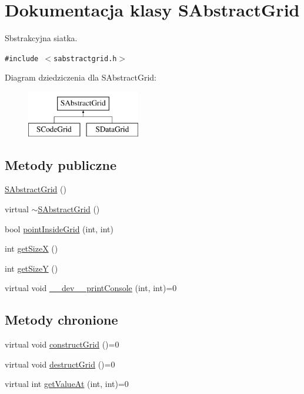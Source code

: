 \hypertarget{classSAbstractGrid}{
\section{Dokumentacja klasy SAbstractGrid}
\label{classSAbstractGrid}
}
Sbstrakcyjna siatka.  


{\tt \#include $<$sabstractgrid.h$>$}

Diagram dziedziczenia dla SAbstractGrid:\begin{figure}[H]
\begin{center}
\leavevmode
\includegraphics[height=2cm]{classSAbstractGrid}
\end{center}
\end{figure}
\subsection*{Metody publiczne}
\begin{CompactItemize}
\item 
\hyperlink{classSAbstractGrid_2df5b6a5bd2a11d9015104f3dd6afc20}{SAbstractGrid} ()
\item 
virtual \hyperlink{classSAbstractGrid_7391180cba323fbd0d64d23157c8a6a6}{$\sim$SAbstractGrid} ()
\item 
bool \hyperlink{classSAbstractGrid_1e4823efb8b482d44466d8324f63dfb1}{pointInsideGrid} (int, int)
\item 
int \hyperlink{classSAbstractGrid_79e2d4403dc5b76fe67e36169bb9f706}{getSizeX} ()
\item 
int \hyperlink{classSAbstractGrid_a1b6e5aaf2c870e1ef15a9f93459b820}{getSizeY} ()
\item 
virtual void \hyperlink{classSAbstractGrid_e36c03b21a96f33d1ace5fd0b1d218f5}{\_\-\_\-dev\_\-\_\-printConsole} (int, int)=0
\end{CompactItemize}
\subsection*{Metody chronione}
\begin{CompactItemize}
\item 
virtual void \hyperlink{classSAbstractGrid_919248aad138ffb1c969e73c3e637dcd}{constructGrid} ()=0
\item 
virtual void \hyperlink{classSAbstractGrid_fb63d8cf5210c3606a3b7add19f06833}{destructGrid} ()=0
\item 
virtual int \hyperlink{classSAbstractGrid_d8772e08d58f970d885775cb9682bf6d}{getValueAt} (int, int)=0
\end{CompactItemize}
